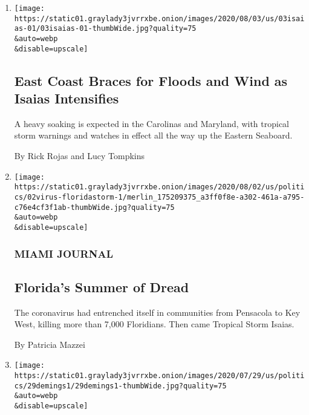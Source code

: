 \begin{enumerate}
\def\labelenumi{\arabic{enumi}.}
\item
  \href{/2020/08/03/us/isaias-east-coast-landfall.html}{}

  \texttt{[image: https://static01.graylady3jvrrxbe.onion/images/2020/08/03/us/03isaias-01/03isaias-01-thumbWide.jpg?quality=75\\\&auto=webp\\\&disable=upscale]}

  \hypertarget{east-coast-braces-for-floods-and-wind-as-isaias-intensifies}{%
  \subsection{East Coast Braces for Floods and Wind as Isaias
  Intensifies}\label{east-coast-braces-for-floods-and-wind-as-isaias-intensifies}}

  A heavy soaking is expected in the Carolinas and Maryland, with
  tropical storm warnings and watches in effect all the way up the
  Eastern Seaboard.

  By Rick Rojas and Lucy Tompkins
\item
  \href{/2020/08/02/us/florida-hurricane-isaias-coronavirus.html}{}

  \texttt{[image: https://static01.graylady3jvrrxbe.onion/images/2020/08/02/us/politics/02virus-floridastorm-1/merlin\_175209375\_a3ff0f8e-a302-461a-a795-c76e4cf3f1ab-thumbWide.jpg?quality=75\\\&auto=webp\\\&disable=upscale]}

  \hypertarget{miami-journal}{%
  \subsubsection{MIAMI JOURNAL}\label{miami-journal}}

  \hypertarget{floridas-summer-of-dread}{%
  \subsection{Florida's Summer of
  Dread}\label{floridas-summer-of-dread}}

  The coronavirus had entrenched itself in communities from Pensacola to
  Key West, killing more than 7,000 Floridians. Then came Tropical Storm
  Isaias.

  By Patricia Mazzei
\item
  \href{/article/val-demings-biden-vp.html}{}

  \texttt{[image: https://static01.graylady3jvrrxbe.onion/images/2020/07/29/us/politics/29demings1/29demings1-thumbWide.jpg?quality=75\\\&auto=webp\\\&disable=upscale]}


\end{enumerate}
